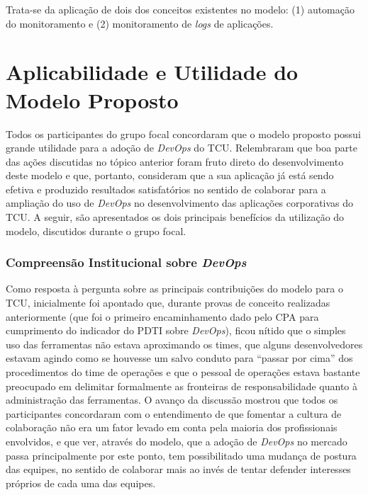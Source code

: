 
Trata-se da aplicação de dois dos conceitos existentes no modelo: (1) automação
do monitoramento e (2) monitoramento de {\it logs} de aplicações.

\section{Aplicabilidade e Utilidade do Modelo Proposto}

Todos os participantes do grupo focal concordaram que o modelo proposto possui
grande utilidade para a adoção de {\it DevOps} do \acrshort{TCU}. Relembraram
que boa parte das ações discutidas no tópico anterior foram fruto direto do
desenvolvimento deste modelo e que, portanto, consideram que a sua aplicação
já está sendo efetiva e produzido resultados satisfatórios no sentido de colaborar
para a ampliação do uso de {\it DevOps} no desenvolvimento das aplicações
corporativas do \acrshort{TCU}. A seguir, são apresentados os dois principais
benefícios da utilização do modelo, discutidos durante o grupo focal.

\subsubsection{Compreensão Institucional sobre \emph{DevOps}}

Como resposta à pergunta sobre as principais contribuições do modelo para o
\acrshort{TCU}, inicialmente foi apontado que, durante provas
de conceito realizadas anteriormente (que foi o primeiro encaminhamento dado
pelo \acrshort{CPA} para cumprimento do indicador do \acrshort{PDTI} sobre {\it DevOps}), ficou
nítido que o simples uso das ferramentas não estava aproximando os times, que
alguns desenvolvedores estavam agindo como se houvesse um salvo conduto para
``passar por cima'' dos procedimentos do time de operações e que o pessoal de
operações estava bastante preocupado em delimitar formalmente as fronteiras de
responsabilidade quanto à administração das ferramentas. O avanço da discussão
mostrou que todos os participantes concordaram com o entendimento de que
fomentar a cultura de colaboração não era um fator levado em conta pela maioria
dos profissionais envolvidos, e que
ver, através do modelo, que a adoção de {\it DevOps} no mercado passa
principalmente por este ponto, tem possibilitado uma mudança de postura das
equipes, no sentido de colaborar mais ao invés de tentar defender interesses
próprios de cada uma das equipes.

